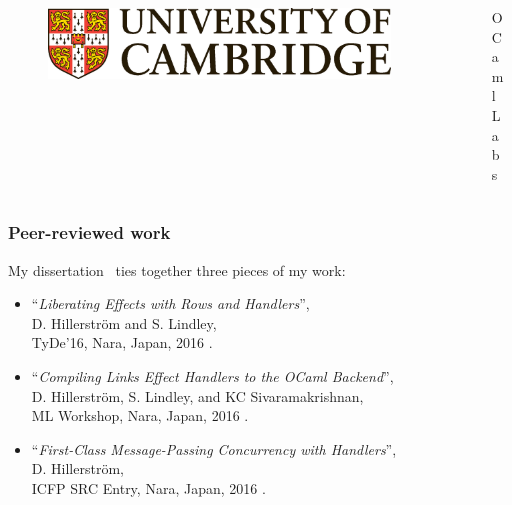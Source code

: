 \documentclass[10pt,compress]{beamer}
\begin{document}
\begin{frame}[plain]
\vfill

\begin{columns}[T]
\begin{column}{0.5\textwidth}
\begin{figure}
\includegraphics[scale=0.18]{figures/cambridge.eps}
\end{figure}
\end{column}
\hfill
\begin{column}{0.5\textwidth}
\begin{figure}
OCaml Labs
\end{figure}
\end{column}
\end{columns}

\end{frame}

\begin{frame}[plain]
  \maketitle
\end{frame}

\begin{frame}
  \frametitle{Peer-reviewed work}
My dissertation~\cite{Hillerstrom16b} ties together three pieces of my work:
\begin{itemize}
  \item ``\emph{Liberating Effects with Rows and Handlers}'',\\  D. Hillerström and S. Lindley,\\ TyDe'16, Nara, Japan, 2016 \cite{HillerstromL16}.
  \item  ``\emph{Compiling Links Effect Handlers to the OCaml Backend}'',\\ D. Hillerström, S. Lindley, and KC Sivaramakrishnan,\\ ML Workshop, Nara, Japan, 2016 \cite{HillerstromLS16}.
  \item ``\emph{First-Class Message-Passing Concurrency with Handlers}'',\\D. Hillerström,\\
    ICFP SRC Entry, Nara, Japan, 2016 \cite{Hillerstrom16a}.
\end{itemize}
\end{frame}
\end{document}
